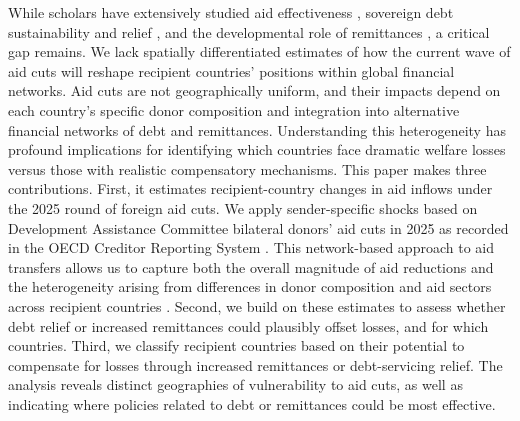 \documentclass[fleqn,10pt,twocolumn]{wlscirep}
\begin{document}
{
While scholars have extensively studied aid effectiveness \cite{burnside2000aid, clemens2012counting}, sovereign debt sustainability and relief \cite{addison2005aid, cordella2013give}, and the developmental role of remittances \cite{ratha2005workers}, a critical gap remains. We lack spatially differentiated estimates of how the current wave of aid cuts will reshape recipient countries' positions within global financial networks. Aid cuts are not geographically uniform, and their impacts depend on each country's specific donor composition and integration into alternative financial networks of debt and remittances. Understanding this heterogeneity has profound implications for identifying which countries face dramatic welfare losses versus those with realistic compensatory mechanisms. This paper makes three contributions. First, it estimates recipient-country changes in aid inflows under the 2025 round of foreign aid cuts. We apply sender-specific shocks based on Development Assistance Committee bilateral donors' aid cuts in 2025 as recorded in the OECD Creditor Reporting System \cite{OECD_CRS_2026}. This network-based approach to aid transfers allows us to capture both the overall magnitude of aid reductions and the heterogeneity arising from differences in donor composition and aid sectors across recipient countries \cite{hayward_united_2026}. Second, we build on these estimates to assess whether debt relief or increased remittances could plausibly offset losses, and for which countries. Third, we classify recipient countries based on their potential to compensate for losses through increased remittances or debt-servicing relief. The analysis reveals distinct geographies of vulnerability to aid cuts, as well as indicating where policies related to debt or remittances could be most effective. 
}
\end{document}
